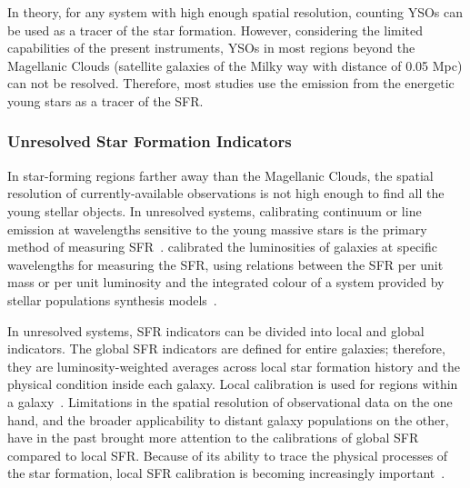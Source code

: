 In theory, for any system with high enough spatial resolution, counting YSOs can be used as a tracer of the star formation. 
However, considering the limited capabilities of the present instruments, YSOs in most regions beyond the Magellanic Clouds (satellite galaxies of the Milky way with distance of 0.05 Mpc) can not be resolved. 
Therefore, most studies use the emission from the energetic young stars as a tracer of the SFR. 
\subsubsection{Unresolved Star Formation Indicators}

 In star-forming regions farther away than the Magellanic Clouds, the spatial resolution of currently-available observations is not high enough to find all the young stellar objects. 
 In unresolved systems, calibrating continuum or line emission at wavelengths sensitive to the young massive stars is the primary method of measuring SFR~\citep[e.g.,][]{Kennicutt98b, Kewley02, Bell03, Calzetti07, Calzetti08, Calzetti10, Calzetti13, Kennicutt07, Kennicutt09, Boquien10, Hao11, Kennicutt12}. 
\cite{Kennicutt98b} calibrated the luminosities of galaxies at specific wavelengths for measuring the SFR, using relations between the SFR per unit mass or per unit luminosity and the integrated colour of a system provided by stellar populations synthesis models~\citep[e.g.,][]{Bruzual93}. 

In unresolved systems, SFR indicators can be divided into local and global indicators. 
The global SFR indicators are defined for entire galaxies; therefore, they are luminosity-weighted averages across local star formation history and the physical condition inside each galaxy. 
Local calibration is used for regions within a galaxy~\citep[e.g.,][]{Zhu08, Kennicutt09, Boquien10, Boquien11, Hao11}.
Limitations in the spatial resolution of observational data on the one hand, and the broader applicability to distant galaxy populations on the other, have in the past brought more attention to the calibrations of global SFR compared to local SFR. 
Because of its ability to trace the physical processes of the star formation, local SFR calibration is becoming increasingly important~\citep{Calzetti13}.

